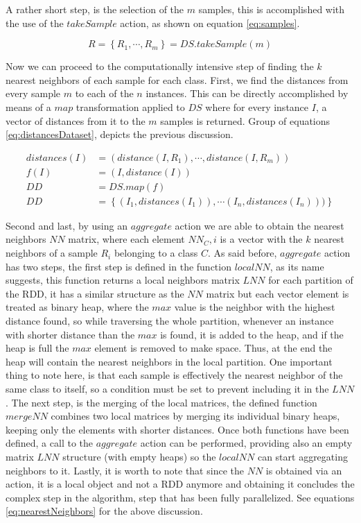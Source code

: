 A rather short step, is the selection of the $m$ samples, this is accomplished with the use of the $takeSample$ action, as shown on equation \ref{eq:samples}.

\begin{equation}
\label{eq:samples}
R = \left \{ R_1,\cdots,R_m \right \} = DS.takeSample(m)
\end{equation}

Now we can proceed to the computationally intensive step of finding the $k$ nearest neighbors of each sample for each class. First, we find the distances from every sample $m$ to each of the $n$ instances. This can be directly accomplished by means of a $map$ transformation applied to $DS$ where for every instance $I$, a vector of distances from it to the $m$ samples is returned. Group of equations \ref{eq:distancesDataset}, depicts the previous discussion.

\begin{align}
\label{eq:distancesDataset}
distances(I) & = (distance(I,R_1), \cdots ,distance(I,R_m)) \nonumber \\
f(I) & = (I, distance(I)) \nonumber \\
DD & = DS.map(f) \nonumber \\
DD & = \left \{ (I_1, distances(I_1)),\cdots (I_n, distances(I_n))) \right \} 
\end{align}

Second and last, by using an $aggregate$ action we are able to obtain the nearest neighbors $NN$ matrix, where each element $NN_C,i$ is a vector with the $k$ nearest neighbors of a sample $R_i$ belonging to a class $C$. As said before, $aggregate$ action has two steps, the first step is defined in the function $localNN$, as its name suggests, this function returns a local neighbors matrix $LNN$ for each partition of the RDD, it has a similar structure as the $NN$ matrix but each vector element is treated as binary heap, where the $max$ value is the neighbor with the highest distance found, so while traversing the whole partition, whenever an instance with shorter distance than the $max$ is found, it is added to the heap, and if the heap is full the $max$ element is removed to make space. Thus, at the end the heap will contain the nearest neighbors in the local partition. One important thing to note here, is that each sample is effectively the nearest neighbor of the same class to itself, so a condition must be set to prevent including it in the $LNN$. The next step, is the merging of the local matrices, the defined function $mergeNN$ combines two local matrices by merging its individual binary heaps, keeping only the elements with shorter distances. Once both functions have been defined, a call to the $aggregate$ action can be performed, providing also an empty matrix $LNN$ structure (with empty heaps) so the $localNN$ can start aggregating neighbors to it. Lastly, it is worth to note that since the $NN$ is obtained via an action, it is a local object and not a RDD anymore and obtaining it concludes the complex step in the algorithm, step that has been fully parallelized. See equations \ref{eq:nearestNeighbors} for the above discussion.

